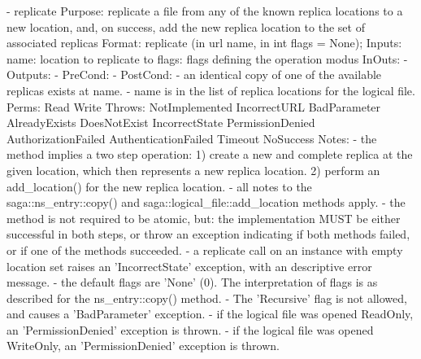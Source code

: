 \begin{myspec}
 
    - replicate 
      Purpose:  replicate a file from any of the known
                replica locations to a new location, and, on 
                success, add the new replica location to the 
                set of associated replicas 
      Format:   replicate        (in  url       name, 
                                  in  int       flags = None);
      Inputs:   name:             location to replicate to
                flags:            flags defining the operation
                                  modus
      InOuts:   -
      Outputs:  -
      PreCond:  -
      PostCond: - an identical copy of one of the available
                  replicas exists at name.
                - name is in the list of replica locations
                  for the logical file.
      Perms:    Read 
                Write
      Throws:   NotImplemented
                IncorrectURL
                BadParameter
                AlreadyExists
                DoesNotExist
                IncorrectState
                PermissionDenied
                AuthorizationFailed
                AuthenticationFailed
                Timeout
                NoSuccess
      Notes:    - the method implies a two step operation:
                  1) create a new and complete replica at the
                     given location, which then represents
                     a new replica location.
                  2) perform an add_location() for the new
                     replica location.
                - all notes to the saga::ns_entry::copy() and
                  saga::logical_file::add_location methods
                  apply.
                - the method is not required to be atomic, but:
                  the implementation MUST be either
                  successful in both steps, or throw an
                  exception indicating if both methods failed, 
                  or if one of the methods succeeded.
                - a replicate call on an instance with empty
                  location set raises an 'IncorrectState'
                  exception, with an descriptive error message.  
                - the default flags are 'None' (0).  The
                  interpretation of flags is as described for 
                  the ns_entry::copy() method.  
                - The 'Recursive' flag is not allowed, and 
                  causes a 'BadParameter' exception.
                - if the logical file was opened ReadOnly, an
                  'PermissionDenied' exception is thrown.
                - if the logical file was opened WriteOnly, an
                  'PermissionDenied' exception is thrown.
 \end{myspec}
 
